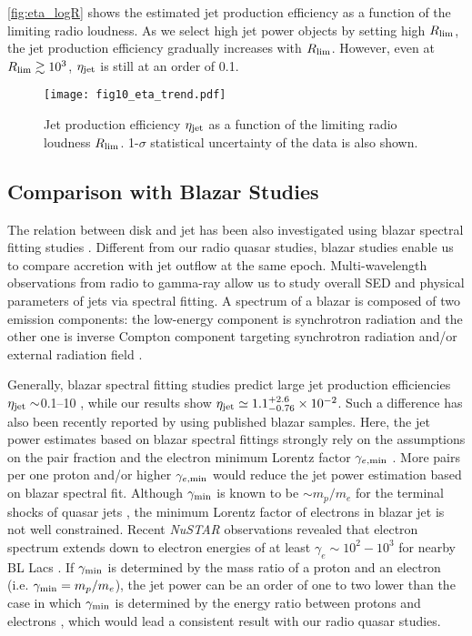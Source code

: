 \documentclass[preprint2,twocolappendix]{aastex6}
\begin{document}
\autoref{fig:eta_logR} shows the estimated jet production efficiency as a function of the limiting radio loudness. As we select high jet power objects by setting high $R_{\rm lim}$, the jet production efficiency gradually increases with $R_{\rm lim}$. However, even at $R_{\rm lim}\gtrsim10^3$, $\eta_{\rm jet}$ is still at an order of 0.1.

\begin{figure}[t]
 \begin{center}
  \texttt{[image: fig10\_eta\_trend.pdf]} 
 \end{center}
\caption{Jet production efficiency $\eta_{\rm jet}$ as a function of the limiting radio loudness $R_{\rm lim}$. 1-$\sigma$ statistical uncertainty of the data is also shown.}\label{fig:eta_logR}
\end{figure}

\subsection{Comparison with Blazar Studies}
The relation between disk and jet has been also investigated using blazar spectral fitting studies \citep[e.g.][]{cel08,ghi14,ino16}. Different from our radio quasar studies, blazar studies enable us to compare accretion with jet outflow at the same epoch. Multi-wavelength observations from radio to gamma-ray allow us to study overall SED and physical parameters of jets via spectral fitting. A spectrum of a blazar is composed of two emission components:  the low-energy component is synchrotron radiation and the other one is inverse Compton component targeting synchrotron radiation \citep[e.g.][]{jon74,mar92} and/or external radiation field \citep[e.g.][]{der93,sik94}. 

Generally, blazar spectral fitting studies predict large jet production efficiencies $\eta_{\rm jet}\sim$0.1--10 \citep[e.g.][]{cel08,ghi14,ino16}, while our results show $\eta_{\rm jet}\simeq1.1_{-0.76}^{+2.6}\times10^{-2}$. Such a difference has also been recently reported by \citet{pja16} using published blazar samples. Here, the jet power estimates based on blazar spectral fittings strongly rely on the assumptions on the pair fraction and the electron minimum Lorentz factor $\gamma_{e, \rm min}$ \citep[see e.g.][]{ino16,pja16}. More pairs per one proton  and/or higher $\gamma_{e, \rm min}$ would reduce the jet power estimation based on blazar spectral fit. Although $\gamma_{\rm min}$ is known to be $\sim m_p/m_e$ for the terminal shocks of quasar jets \citep{sta07}, the minimum Lorentz factor of electrons in blazar jet is not well constrained. Recent {\it NuSTAR} observations revealed that electron spectrum extends down to electron energies of at least $\gamma_e\sim10^2-10^3$ for nearby BL Lacs \citep{kat16,mad16}. If $\gamma_{\rm min}$ is determined by the mass ratio of a proton and an electron (i.e. $\gamma_{\rm min}=m_p/m_e$), the jet power can be an order of one to two lower than the case in which $\gamma_{\rm min}$ is determined by the energy ratio between protons and electrons \citep{ino16}, which would lead a consistent result with our radio quasar studies. 
\end{document}

